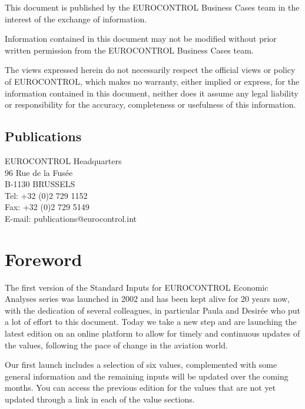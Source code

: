 \documentclass[
  11pt,
  a4paper,
]{book}
\begin{document}
This document is published by the EUROCONTROL Business Cases team in the
interest of the exchange of information.

Information contained in this document may not be modified without prior
written permission from the EUROCONTROL Business Cases team.

The views expressed herein do not necessarily respect the official views
or policy of EUROCONTROL, which makes no warranty, either implied or
express, for the information contained in this document, neither does it
assume any legal liability or responsibility for the accuracy,
completeness or usefulness of this information.

\hypertarget{publications}{%
\section*{Publications}\label{publications}}


EUROCONTROL Headquarters\\
96 Rue de la Fusée\\
B-1130 BRUSSELS\\
Tel: +32 (0)2 729 1152\\
Fax: +32 (0)2 729 5149\\
E-mail: publications@eurocontrol.int


\hypertarget{foreword}{%
\chapter*{Foreword}\label{foreword}}


The first version of the Standard Inputs for EUROCONTROL Economic
Analyses series was launched in 2002 and has been kept alive for 20
years now, with the dedication of several colleagues, in particular
Paula and Desirée who put a lot of effort to this document. Today we
take a new step and are launching the latest edition on an online
platform to allow for timely and continuous updates of the values,
following the pace of change in the aviation world.

Our first launch includes a selection of six values, complemented with
some general information and the remaining inputs will be updated over
the coming months. You can access the previous edition for the values
that are not yet updated through a link in each of the value sections.
\end{document}
